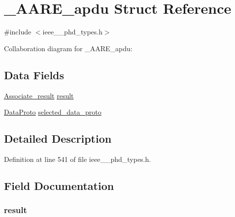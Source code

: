 \hypertarget{struct___a_a_r_e__apdu}{}\section{\+\_\+\+A\+A\+R\+E\+\_\+apdu Struct Reference}
\label{struct___a_a_r_e__apdu}


{\ttfamily \#include $<$ieee\+\_\+\_\+phd\+\_\+types.\+h$>$}



Collaboration diagram for \+\_\+\+A\+A\+R\+E\+\_\+apdu\+:
\subsection*{Data Fields}
\begin{DoxyCompactItemize}
\item 
\hyperlink{ieee__11073__phd__types_8h_ac652f34ade461f339905b8731b19ba28}{Associate\+\_\+result} \hyperlink{struct___a_a_r_e__apdu_ac5742c7a164a66562c3b1ba3ed72b78f}{result}
\item 
\hyperlink{ieee__11073__phd__types_8h_a53b4378eb73bafac24f4b68bf1ca1b7e}{Data\+Proto} \hyperlink{struct___a_a_r_e__apdu_a6c320a2b89fb315ce2bf7c0f3201116a}{selected\+\_\+data\+\_\+proto}
\end{DoxyCompactItemize}


\subsection{Detailed Description}


Definition at line 541 of file ieee\+\_\+\_\+phd\+\_\+types.\+h.



\subsection{Field Documentation}
\hypertarget{struct___a_a_r_e__apdu_ac5742c7a164a66562c3b1ba3ed72b78f}{}
\subsubsection[{result}]{ result}\label{struct___a_a_r_e__apdu_ac5742c7a164a66562c3b1ba3ed72b78f}


